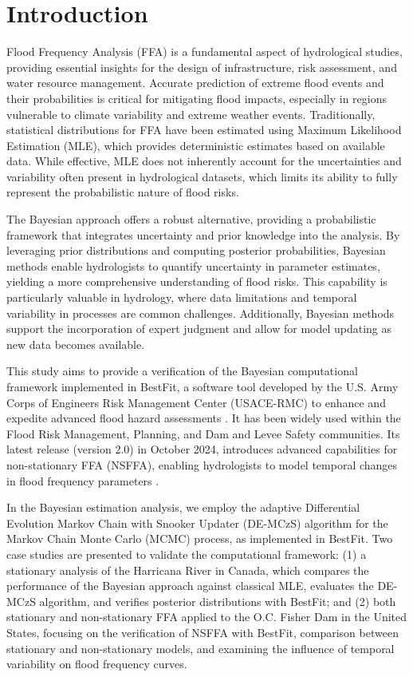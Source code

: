 \section{Introduction}
Flood Frequency Analysis (FFA) is a fundamental aspect of hydrological studies, providing essential insights for the design of infrastructure, risk assessment, and water resource management. Accurate prediction of extreme flood events and their probabilities is critical for mitigating flood impacts, especially in regions vulnerable to climate variability and extreme weather events. Traditionally, statistical distributions for FFA have been estimated using Maximum Likelihood Estimation (MLE), which provides deterministic estimates based on available data. While effective, MLE does not inherently account for the uncertainties and variability often present in hydrological datasets, which limits its ability to fully represent the probabilistic nature of flood risks.

The Bayesian approach offers a robust alternative, providing a probabilistic framework that integrates uncertainty and prior knowledge into the analysis. By leveraging prior distributions and computing posterior probabilities, Bayesian methods enable hydrologists to quantify uncertainty in parameter estimates, yielding a more comprehensive understanding of flood risks. This capability is particularly valuable in hydrology, where data limitations and temporal variability in processes are common challenges. Additionally, Bayesian methods support the incorporation of expert judgment and allow for model updating as new data becomes available.

This study aims to provide a verification of the Bayesian computational framework implemented in BestFit, a software tool developed by the U.S. Army Corps of Engineers Risk Management Center (USACE-RMC) to enhance and expedite advanced flood hazard assessments \citep{Smith_2020}. It has been widely used within the Flood Risk Management, Planning, and Dam and Levee Safety communities. Its latest release (version 2.0) in October 2024, introduces advanced capabilities for non-stationary FFA (NSFFA), enabling hydrologists to model temporal changes in flood frequency parameters \citep{Smith_2024}.

In the Bayesian estimation analysis, we employ the adaptive Differential Evolution Markov Chain with Snooker Updater (DE-MCzS) algorithm for the Markov Chain Monte Carlo (MCMC) process, as implemented in BestFit. Two case studies are presented to validate the computational framework: (1) a stationary analysis of the Harricana River in Canada, which compares the performance of the Bayesian approach against classical MLE, evaluates the DE-MCzS algorithm, and verifies posterior distributions with BestFit; and (2) both stationary and non-stationary FFA applied to the O.C. Fisher Dam in the United States, focusing on the verification of NSFFA with BestFit, comparison between stationary and non-stationary models, and examining the influence of temporal variability on flood frequency curves.

\FloatBarrier
